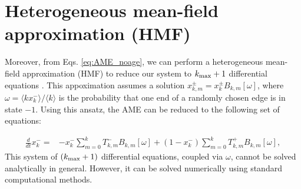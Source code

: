 

\section{\label{sec:Heterogeneous mean-field approximation}  Heterogeneous mean-field approximation (HMF)}

Moreover, from Eqs. \eqref{eq:AME_noage}, we can perform a heterogeneous mean-field approximation (HMF) to reduce our system to $k_{\rm max}+1$ differential equations \cite{gleeson-2013}. This appoximation assumes a solution $x^{\pm}_{k,m} = x_{k}^{\pm} B_{k,m} [\omega]$, where $\omega = \langle k x^{-}_{k} \rangle / \langle k \rangle$ is the probability that one end of a randomly chosen edge is in state $-1$. Using this ansatz, the AME can be reduced to the following set of equations:

\begin{eqnarray}
    \frac{d}{d t} x^{-}_{k}= &- x^{-}_{k} \sum_{m=0}^{k} T^{-}_{k, m} B_{k, m}[\omega] +\left(1-x^{-}_{k}\right) \sum_{m=0}^{k} T^{+}_{k, m} B_{k, m}[\omega],
    \label{eq:HMF}
\end{eqnarray}
This system of $(k_{\rm max}+1)$ differential equations, coupled via $\omega$, cannot be solved analytically in general. However, it can be solved numerically using standard computational methods.


